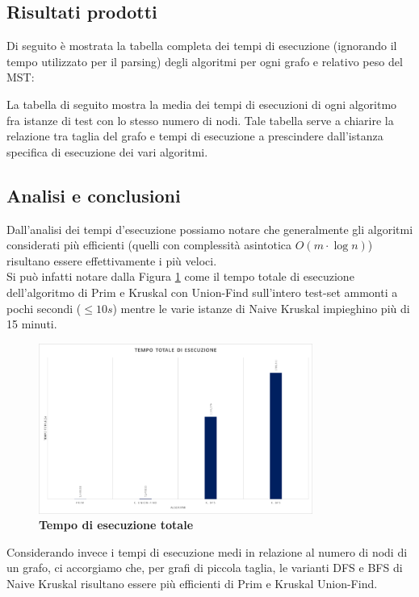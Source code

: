 \documentclass[]{article}
\begin{document}
\subsection{Risultati prodotti}
\begin{flushleft}
Di seguito è mostrata la tabella completa dei tempi di esecuzione (ignorando il tempo utilizzato per il parsing) degli algoritmi per ogni grafo e relativo peso del MST: 


La tabella di seguito mostra la media dei tempi di esecuzioni di ogni algoritmo fra istanze di test con lo stesso numero di nodi. Tale tabella serve a chiarire la relazione tra taglia del grafo e tempi di esecuzione a prescindere dall'istanza specifica di esecuzione dei vari algoritmi.


\subsection{Analisi e conclusioni}
Dall'analisi dei tempi d'esecuzione possiamo notare che generalmente gli algoritmi considerati più efficienti (quelli con complessità asintotica $O(m\cdot\log n)$) risultano essere effettivamente i più veloci.\\
Si può infatti notare dalla Figura \ref{total} come il tempo totale di esecuzione dell'algoritmo di Prim e Kruskal con Union-Find sull'intero test-set ammonti a pochi secondi ($\leq 10 s$) mentre le varie istanze di Naive Kruskal impieghino più di 15 minuti.
\begin{figure}[H]
	\centering
	\includegraphics[width=0.8\textwidth,height=\textheight,keepaspectratio]{grafo_costo_totale.png}
	\caption{\textbf{Tempo di esecuzione totale}}
	\label{total}
\end{figure}
Considerando invece i tempi di esecuzione medi in relazione al numero di nodi di un grafo, ci accorgiamo che, per grafi di piccola taglia, le varianti DFS e BFS di Naive Kruskal risultano essere più efficienti di Prim e Kruskal Union-Find.\\

\end{flushleft}
\end{document}
